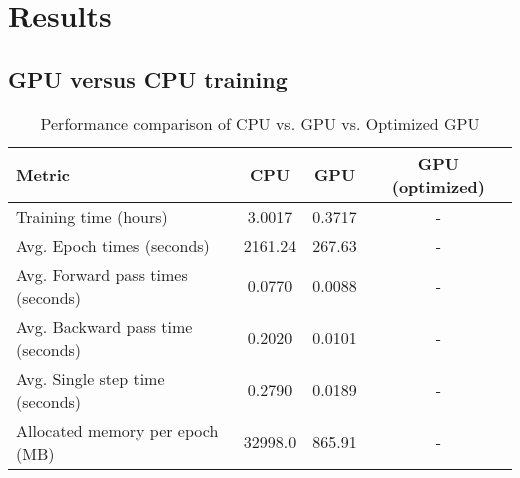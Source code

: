 \section{Results}

\subsection{GPU versus CPU training}
\begin{table}[h]
    \centering
    \begin{tabular}{lccc}
        \toprule
        \textbf{Metric} & \textbf{CPU} & \textbf{GPU} & \textbf{GPU (optimized)} \\
        \midrule
        Training time (hours)       & 3.0017 & 0.3717 & - \\
        Avg. Epoch times (seconds)       & 2161.24 & 267.63 & - \\
        Avg. Forward pass times (seconds)& 0.0770 & 0.0088 & - \\
        Avg. Backward pass time (seconds)& 0.2020 & 0.0101 & - \\
        Avg. Single step time (seconds)  & 0.2790 & 0.0189 & - \\
        Allocated memory per epoch (MB)       & 32998.0  & 865.91 & - \\
        \bottomrule
    \end{tabular}
    \caption{Performance comparison of CPU vs. GPU vs. Optimized GPU}
\end{table}



